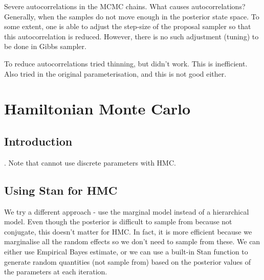 \documentclass[english, 11pt]{article}
\begin{document}
Severe autocorrelations in the MCMC chains. What causes autocorrelations? Generally, when the samples do not move enough in the posterior state space. To some extent, one is able to adjust the step-size of the proposal sampler so that this autocorrelation is reduced. However, there is no such adjustment (tuning) to be done in Gibbs sampler. 

To reduce autocorrelations tried thinning, but didn't work. This is inefficient. Also tried in the original parameterisation, and this is not good either.

\section{Hamiltonian Monte Carlo}
\label{sec:hmc}

\subsection{Introduction}

.
Note that cannot use discrete parameters with HMC.

\subsection{Using Stan for HMC}

We try a different approach - use the marginal model instead of a hierarchical model. Even though the posterior is difficult to sample from because not conjugate, this doesn't matter for HMC. In fact, it is more efficient because we marginalise all the random effects so we don't need to sample from these. We can either use Empirical Bayes estimate, or we can use a built-in Stan  function to generate random quantities (not sample from) based on the posterior values of the parameters at each iteration.
\end{document}

